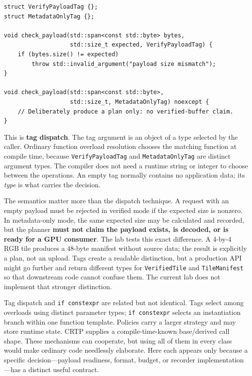 \begin{verbatim}
struct VerifyPayloadTag {};
struct MetadataOnlyTag {};

void check_payload(std::span<const std::byte> bytes,
                   std::size_t expected, VerifyPayloadTag) {
    if (bytes.size() != expected)
        throw std::invalid_argument("payload size mismatch");
}

void check_payload(std::span<const std::byte>,
                   std::size_t, MetadataOnlyTag) noexcept {
    // Deliberately produce a plan only: no verified-buffer claim.
}
\end{verbatim}

This is \textbf{tag dispatch}. The tag argument is an object of a type selected by the caller. Ordinary function overload resolution chooses the matching function at compile time, because \texttt{VerifyPayloadTag} and \texttt{MetadataOnlyTag} are distinct argument types. The compiler does not need a runtime string or integer to choose between the operations. An empty tag normally contains no application data; its \emph{type} is what carries the decision.

The semantics matter more than the dispatch technique. A request with an empty payload must be rejected in verified mode if the expected size is nonzero. In metadata-only mode, the same expected size may be calculated and recorded, but the planner \textbf{must not claim the payload exists, is decoded, or is ready for a GPU consumer}. The lab tests this exact difference. A 4-by-4 RGB tile produces a 48-byte manifest without source data; the result is explicitly a plan, not an upload. Tags create a readable distinction, but a production API might go further and return different types for \texttt{VerifiedTile} and \texttt{TileManifest} so that downstream code cannot confuse them. The current lab does not implement that stronger distinction.

Tag dispatch and \texttt{if\ constexpr} are related but not identical. Tags select among overloads using distinct parameter types; \texttt{if\ constexpr} selects an instantiation branch within one function template. Policies carry a larger strategy and may store runtime state. CRTP supplies a compile-time-known base/derived call shape. These mechanisms can cooperate, but using all of them in every class would make ordinary code needlessly elaborate. Here each appears only because a specific decision---payload readiness, format, budget, or recorder implementation---has a distinct useful contract.

